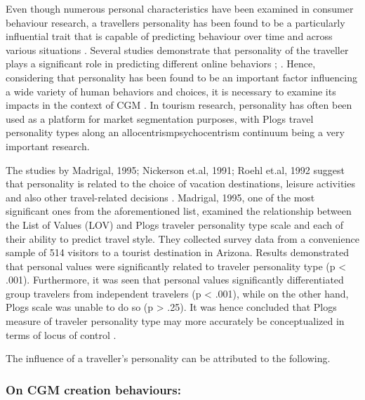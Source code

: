 Even though numerous personal characteristics have been examined in consumer behaviour research, a traveller\textquotesingle s personality has been found to be a particularly influential trait that is capable of predicting behaviour over time and across various situations \cite{woszczynski2002exploring}. Several studies demonstrate that personality of the traveller plays a significant role in predicting different online behaviors\cite{yoo2011influence} \cite{acar2007online}; \cite{tuten2001understanding}. Hence, considering that personality has been found to be an important factor influencing a wide variety of human behaviors and choices, it is necessary to examine its impacts in the context of CGM \cite{yoo2011influence}. In tourism research, personality has often been used as a platform for market segmentation purposes, with Plog\textquotesingle s travel personality types along an allocentrism\textemdash psychocentrism continuum being a very important research\cite{plog1973destination}\cite{yoo2011influence}.

The studies by Madrigal, 1995; Nickerson et.al, 1991; Roehl et.al, 1992 suggest that personality is related to the choice of vacation destinations, leisure activities and also other travel-related decisions \cite{madrigal1995personal}\cite{nickerson1991traveler}\cite{roehl1992risk}. Madrigal, 1995, one of the most significant ones from the aforementioned list, examined the relationship between the List of Values (LOV) and Plog\textquotesingle s traveler personality type scale and each of their ability to predict travel style. They collected survey data from a convenience sample of 514 visitors to a tourist destination in Arizona. Results demonstrated that personal values were significantly related to traveler personality type (p < .001). Furthermore, it was seen that personal values significantly differentiated group travelers from independent travelers (p < .001), while on the other hand, Plog\textquotesingle s scale was unable to do so (p > .25). It was hence concluded that Plog\textquotesingle s measure of traveler personality type may more accurately be conceptualized in terms of locus of control \cite{madrigal1995personal}.

The influence of a traveller's personality can be attributed to the following. 

\subsubsection{On CGM creation behaviours: }\label{3.1}


